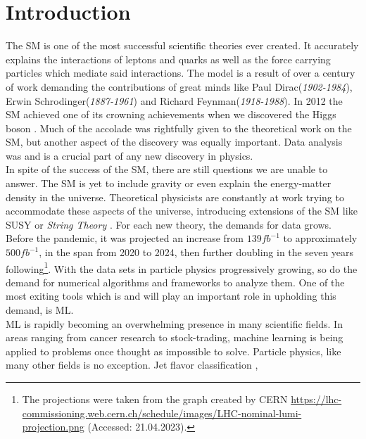 \chapter*{Introduction}
The \ac{SM} is one of the most successful scientific theories ever
created. It accurately explains the interactions of leptons and quarks as well as the force
carrying particles which mediate said interactions. The model is a result of over a century of work
demanding the contributions of great minds like Paul Dirac(\emph{1902-1984}), Erwin Schrodinger(\emph{1887-1961}) and Richard Feynman(\emph{1918-1988}).
In 2012 the \ac{SM} achieved one of its crowning achievements when we discovered the Higgs boson \cite{Aad_2012}. 
Much of the accolade was rightfully given to the theoretical work on the \ac{SM}, but another aspect of the discovery 
was equally important. Data analysis was and is a crucial part of any new discovery in physics. \newline
\\
In spite of the success of the \ac{SM}, there are still questions we are unable to answer.
The \ac{SM} is yet to include gravity or even explain the energy-matter density in the universe. Theoretical physicists are constantly 
at work trying to accommodate these aspects of the universe,
introducing extensions of the \ac{SM} like \ac{SUSY} \cite{SUSY} or \emph{String Theory} \cite{cole_probing_2021}. For each new theory, 
the demands for data grows. Before the pandemic, it was projected an increase from $139fb^{-1}$ to approximately $500fb^{-1}$, in the span from 
2020 to 2024, then further doubling in the seven years following\footnote{The projections were taken from the graph created by CERN
\href{https://lhc-commissioning.web.cern.ch/schedule/images/LHC-nominal-lumi-projection.png}{https://lhc-commissioning.web.cern.ch/schedule/images/LHC-nominal-lumi-projection.png}
(Accessed: 21.04.2023).}. With the data sets in particle physics progressively growing, so do the demand for numerical algorithms and frameworks to analyze them.
One of the most exiting tools which is and will play an important role in upholding this demand, is \ac{ML}.\newline
\\
\acf{ML} is rapidly becoming an overwhelming presence in many scientific fields.
In areas ranging from cancer research to stock-trading, machine learning is being applied to problems
once thought as impossible to solve. Particle physics, like many other fields is no exception. Jet flavor classification \cite{Guest_2016}, 
